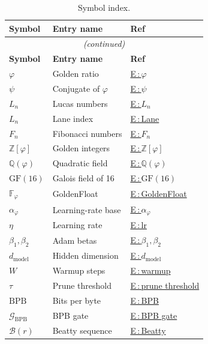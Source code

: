 \begin{longtable}{p{2.4cm} p{6.0cm} p{2.4cm}}
\caption{Symbol index.}
\label{tab:symbol-index}\\
\toprule
\textbf{Symbol} & \textbf{Entry name} & \textbf{Ref} \\
\midrule
\endfirsthead
\multicolumn{3}{c}{\emph{(continued)}} \\
\toprule
\textbf{Symbol} & \textbf{Entry name} & \textbf{Ref} \\
\midrule
\endhead
\bottomrule
\endlastfoot
$\varphi$ & Golden ratio & \hyperref[entry:phi]{E\,:\,$\varphi$} \\
$\psi$ & Conjugate of $\varphi$ & \hyperref[entry:psi]{E\,:\,$\psi$} \\
$L_n$ & Lucas numbers & \hyperref[entry:lucas-numbers]{E\,:\,$L_n$} \\
$L_n$ & Lane index & \hyperref[entry:lane]{E\,:\,Lane} \\
$F_n$ & Fibonacci numbers & \hyperref[entry:fibonacci]{E\,:\,$F_n$} \\
$\mathbb{Z}[\varphi]$ & Golden integers & \hyperref[entry:Zphi]{E\,:\,$\mathbb{Z}[\varphi]$} \\
$\mathbb{Q}(\varphi)$ & Quadratic field & \hyperref[entry:quad-field]{E\,:\,$\mathbb{Q}(\varphi)$} \\
$\mathrm{GF}(16)$ & Galois field of 16 & \hyperref[entry:gf16]{E\,:\,$\mathrm{GF}(16)$} \\
$\mathbb{F}_\varphi$ & GoldenFloat & \hyperref[entry:goldenfloat]{E\,:\,GoldenFloat} \\
$\alpha_\varphi$ & Learning-rate base & \hyperref[entry:alpha-phi]{E\,:\,$\alpha_\varphi$} \\
$\eta$ & Learning rate & \hyperref[entry:lr]{E\,:\,lr} \\
$\beta_1, \beta_2$ & Adam betas & \hyperref[entry:betas]{E\,:\,$\beta_1,\beta_2$} \\
$d_{\mathrm{model}}$ & Hidden dimension & \hyperref[entry:dmodel]{E\,:\,$d_{\mathrm{model}}$} \\
$W$ & Warmup steps & \hyperref[entry:warmup]{E\,:\,warmup} \\
$\tau$ & Prune threshold & \hyperref[entry:prune-threshold]{E\,:\,prune threshold} \\
$\mathrm{BPB}$ & Bits per byte & \hyperref[entry:bpb]{E\,:\,BPB} \\
$\mathcal{G}_{\mathrm{BPB}}$ & BPB gate & \hyperref[entry:bpb-gate]{E\,:\,BPB gate} \\
$\mathcal{B}(r)$ & Beatty sequence & \hyperref[entry:beatty]{E\,:\,Beatty} \\

\end{longtable}
